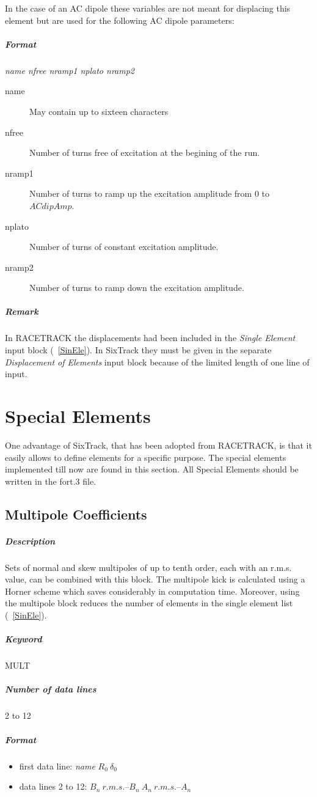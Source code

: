 In the case of an AC dipole these variables are not meant for
displacing this element but are used for the following AC dipole
parameters:
\subparagraph{Format} {\em name nfree nramp1 nplato nramp2}
\begin{description}
\item [name] May contain up to sixteen characters
\item [nfree] Number of turns free of excitation at the begining of
  the run.
\item [nramp1] Number of turns to ramp up the excitation amplitude 
  from 0 to $ACdipAmp$.
\item [nplato] Number of turns of constant excitation amplitude. 
\item [nramp2] Number of turns to ramp down the excitation amplitude.
\end{description}

\subparagraph{Remark} In RACETRACK the displacements had been included
in the {\em Single Element} \/input block (~\ref{SinEle}). In SixTrack
they must be given in the separate {\em Displacement of Elements}
\/input block because of the limited length of one line of input.

\section{Special Elements}

One advantage of SixTrack, that has been adopted from RACETRACK, is
that it easily allows to define elements for a specific purpose. The
special elements implemented till now are found in this section.
All Special Elements should be written in the fort.3 file.

\subsection{Multipole Coefficients} \label{MulCoe}

\subparagraph{Description}

Sets of normal and skew multipoles of up to tenth order, each with an
r.m.s. value, can be combined with this block. The multipole kick is
calculated using a Horner scheme which saves considerably in
computation time. Moreover, using the multipole block reduces the
number of elements in the single element list (~\ref{SinEle}).

\subparagraph{Keyword} MULT \subparagraph{Number of data lines} 2 to
12

\subparagraph{Format}
\begin{itemize}
\item first data line: {\em name} \/$ R_{0}\ \delta_{0} $
\item data lines 2 to 12: $ B_{n}\ r.m.s.$--$B_{n}\ A_{n}\ r.m.s.$--$A_{n} $
\end{itemize}

